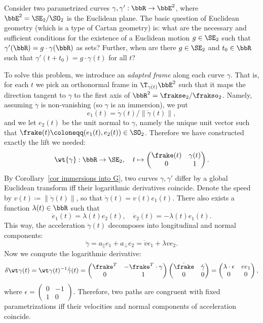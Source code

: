 \begin{example}\label{ex curves in E2}
    Consider two parametrized curves $\gamma,\gamma':\bbR\to \bbE^2$, where $\bbE^2=\SE_2\slash\SO_2$ is the Euclidean plane. The basic question of Euclidean geometry (which is a type of Cartan geometry) is: what are the necessary and sufficient conditions for the existence of a Euclidean motion $g\in\SE_2$ such that $\gamma'(\bbR)=g\cdot \gamma(\bbR)$ as sets? Further, when are there $g\in\SE_2$ and $t_0\in\bbR$ such that $\gamma'(t+t_0)=g\cdot \gamma(t)$ for all $t$?

    To solve this problem, we introduce an \emph{adapted frame} along each curve $\gamma$. That is, for each $t$ we pick an orthonormal frame in $\T_{\gamma(t)}\bbE^2$ such that it maps the direction tangent to $\gamma$ to the first axis of $\bbR^2=\frakse_2\slash\frakso_2$. Namely, assuming $\dot\gamma$ is non-vanishing (so $\gamma$ is an immersion), we put 
    \[e_1(t)=\dot\gamma(t)\slash \lVert\dot\gamma(t)\rVert,\] 
    and we let $e_2(t)$ be the unit normal to $\gamma$, namely the unique unit vector such that $\frake(t)\coloneqq (e_1(t),e_2(t))\in\SO_2$. Therefore we have constructed exactly the lift we needed:
    \[\wt{\gamma}:\bbR\to \SE_2,\quad t\mapsto\begin{pmatrix}
        \frake(t)&\gamma(t) \\
        0&  1
    \end{pmatrix}.\]
    By Corollary~\ref{cor immersions into G}, two curves $\gamma,\gamma'$ differ by a global Euclidean transform iff their logarithmic derivatives coincide. Denote the speed by $v(t)\coloneqq \lVert\dot\gamma(t)\rVert$, so that $\dot\gamma(t)=v(t)e_1(t)$. There also exists a function $\lambda(t)\in\bbR$ such that 
    \[\dot e_1(t)=\lambda(t)e_2(t),\quad \dot e_2(t)=-\lambda(t)e_1(t).\]
    This way, the acceleration $\ddot{\gamma}(t)$ decomposes into longitudinal and normal components:
    \[\ddot\gamma=a_{\parallel}e_1+a_{\perp}e_2=\dot ve_1+\lambda ve_2.\]
    Now we compute the logarithmic derivative:
    \[\delta\wt\gamma(t)=\wt\gamma(t)^{-1}\dot{\tilde\gamma}(t)=
    \begin{pmatrix}
        \frake^T & -\frake^T\cdot\gamma\\
        0 & 1
    \end{pmatrix} 
    \begin{pmatrix}
        \dot\frake & \dot\gamma\\
        0 & 0
    \end{pmatrix}
    =
    \begin{pmatrix}
        \lambda\cdot\epsilon & ve_1\\
        0 & 0
    \end{pmatrix},
    \]
    where $\epsilon=\left(\begin{smallmatrix}
        0&-1\\
        1&0
    \end{smallmatrix}\right)$. Therefore, two paths are congruent with fixed parametrizations iff their velocities and normal components of acceleration coincide. 
    

\end{example}
